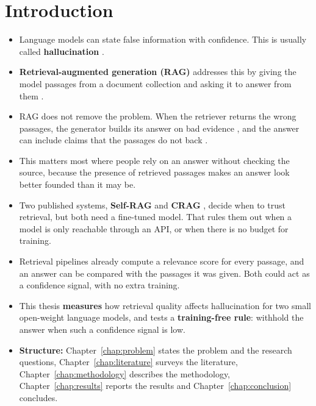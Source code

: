 \chapter{Introduction}

\begin{itemize}
\item Language models can state false information with confidence. This is usually called
  \textbf{hallucination} \cite{ji2023survey}.
\item \textbf{Retrieval-augmented generation (RAG)} addresses this by giving the model passages
  from a document collection and asking it to answer from them \cite{lewis2020rag}.
\item RAG does not remove the problem. When the retriever returns the wrong passages, the
  generator builds its answer on bad evidence \cite{yan2024crag}, and the answer can include
  claims that the passages do not back \cite{niu2024ragtruth}.
\item This matters most where people rely on an answer without checking the source, because the
  presence of retrieved passages makes an answer look better founded than it may be.
\item Two published systems, \textbf{Self-RAG} \cite{asai2024selfrag} and
  \textbf{CRAG} \cite{yan2024crag}, decide when to trust retrieval, but both need a fine-tuned
  model. That rules them out when a model is only reachable through an API, or when there is no
  budget for training.
\item Retrieval pipelines already compute a relevance score for every passage, and an answer can
  be compared with the passages it was given. Both could act as a confidence signal, with no
  extra training.
\item This thesis \textbf{measures} how retrieval quality affects hallucination for two small
  open-weight language models, and tests a \textbf{training-free rule}: withhold the answer when
  such a confidence signal is low.
\item \textbf{Structure:} Chapter~\ref{chap:problem} states the problem and the research
  questions, Chapter~\ref{chap:literature} surveys the literature,
  Chapter~\ref{chap:methodology} describes the methodology, Chapter~\ref{chap:results} reports
  the results and Chapter~\ref{chap:conclusion} concludes.
\end{itemize}
